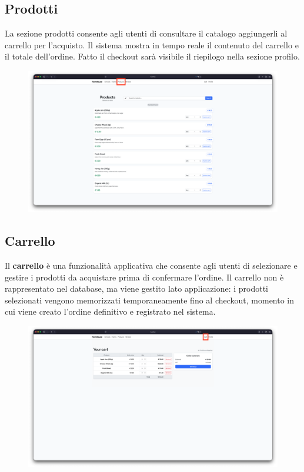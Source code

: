 \documentclass[a4paper,12pt]{report}
\begin{document}
\subsection*{Prodotti}
La sezione prodotti consente agli utenti di consultare il catalogo
aggiungerli al carrello per
l'acquisto. Il sistema mostra in tempo reale il contenuto del
carrello e il totale dell'ordine.
Fatto il checkout sarà visibile il riepilogo nella sezione profilo.

\begin{figure}[H]
  \centering
  \includegraphics[width=\textwidth, trim=0 0 0 0]{./img/users/products.png}
  \vspace{-1em}
  \label{fig:products}
\end{figure}

\subsection*{Carrello}
Il \textbf{carrello} è una funzionalità applicativa che consente agli
utenti di selezionare e
gestire i prodotti da acquistare prima di confermare l'ordine. Il
carrello non è rappresentato
nel database, ma viene gestito lato applicazione: i prodotti
selezionati vengono memorizzati
temporaneamente fino al checkout, momento in cui viene creato
l'ordine definitivo e
registrato nel sistema.

\begin{figure}[H]
  \centering
  \includegraphics[width=\textwidth, trim=0 0 0 0]{./img/users/cart.png}
  \vspace{-1em}
  \label{fig:cart}
\end{figure}
\end{document}
